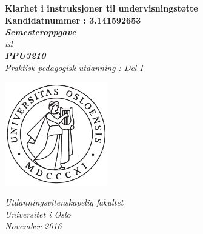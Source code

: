 \documentclass[main.tex]{subfiles}
\begin{document}
\thispagestyle{empty}
\begin{center}        %
  \vspace{5mm}          %
  \LARGE
  \textbf{Klarhet i instruksjoner til undervisningst\o tte} \\
  \Large
  \vspace{10mm}
  \large
  \textbf{Kandidatnummer : 3.141592653} \\
  \vspace{25mm}
  \Large
  {\bf{\textsl{Semesteroppgave}}} \\
  \textsl{til} \\
  \vspace{2mm}
  {\bf{\textsl{PPU3210}}} \\
  \vspace{5mm}
  {\large \textsl {Praktisk pedagogisk utdanning : Del I}}\\
  \vspace{10mm}
  \centerline{\includegraphics[width=45mm,height=45mm,natwidth=5.01,natheight=5.01]{../figures/uiosegl_pdf.pdf}} 
  \vspace{8mm}
  \textsl{Utdanningsvitenskapelig fakultet} \\
  \textsl{Universitet i Oslo} \\
  \vspace{5mm}
  \large
  \textsl{November 2016} \\
\end{center}
\end{document}
